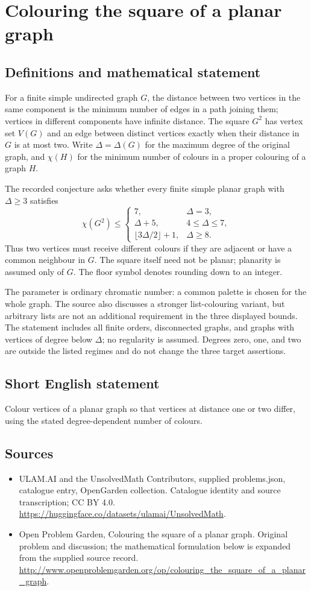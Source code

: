 \documentclass[11pt,a4paper]{article}
\begin{document}
\section*{Colouring the square of a planar graph}\label{statement}

\subsection{Definitions and mathematical statement}
For a finite simple undirected graph $G$, the distance between two vertices
in the same component is the minimum number of edges in a path joining
them; vertices in different components have infinite distance. The square
$G^2$ has vertex set $V(G)$ and an edge between distinct vertices exactly
when their distance in $G$ is at most two. Write $\Delta=\Delta(G)$ for
the maximum degree of the original graph, and $\chi(H)$ for the minimum
number of colours in a proper colouring of a graph $H$.

The recorded conjecture asks whether every finite simple planar graph
with $\Delta\ge3$ satisfies
\[
 \chi(G^2)\le
 \begin{cases}
  7,&\Delta=3,\\
  \Delta+5,&4\le\Delta\le7,\\
  \lfloor3\Delta/2\rfloor+1,&\Delta\ge8.
 \end{cases}
\]
Thus two vertices must receive different colours if they are adjacent
or have a common neighbour in $G$. The square itself need not be planar;
planarity is assumed only of $G$. The floor symbol denotes rounding down
to an integer.

The parameter is ordinary chromatic number: a common palette is chosen
for the whole graph. The source also discusses a stronger list-colouring
variant, but arbitrary lists are not an additional requirement in the
three displayed bounds. The statement includes all finite orders,
disconnected graphs, and graphs with vertices of degree below $\Delta$;
no regularity is assumed. Degrees zero, one, and two are outside the
listed regimes and do not change the three target assertions.
\subsection{Short English statement}
Colour vertices of a planar graph so that vertices at distance one or two differ, using the stated degree-dependent number of colours.
\subsection{Sources}
\begin{itemize}
\item[S1] ULAM.AI and the UnsolvedMath Contributors, supplied problems.json, catalogue entry, OpenGarden collection. Catalogue identity and source transcription; CC BY 4.0.
\url{https://huggingface.co/datasets/ulamai/UnsolvedMath}.
\item[S2] Open Problem Garden, Colouring the square of a planar graph. Original problem and discussion; the mathematical formulation below is expanded from the supplied source record.
\url{http://www.openproblemgarden.org/op/colouring_the_square_of_a_planar_graph}.
\end{itemize}
\end{document}
